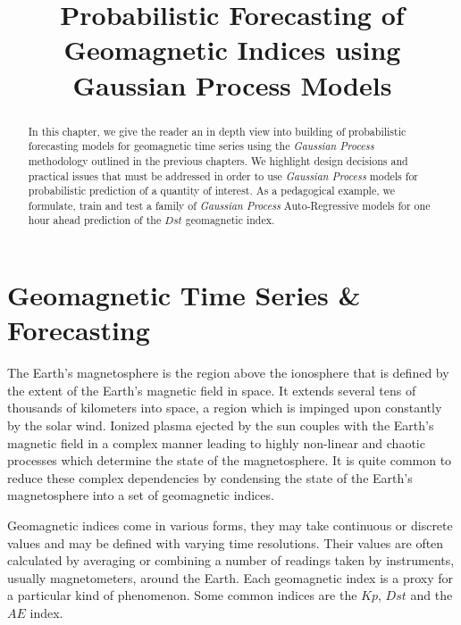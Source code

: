 \documentclass{article}
\title{Probabilistic Forecasting of Geomagnetic Indices using Gaussian Process Models}
\begin{document}
\maketitle

\begin{abstract}

  In this chapter, we give the reader an in depth view into building of
  probabilistic forecasting models for geomagnetic time series using the
  \emph{Gaussian Process} methodology outlined in the previous
  chapters. We highlight design decisions and practical issues that must
  be addressed in order to use \emph{Gaussian Process} models for
  probabilistic prediction of a quantity of interest. As a pedagogical
  example, we formulate, train and test a family of \emph{Gaussian
    Process} Auto-Regressive models for one hour ahead prediction of the $Dst$ geomagnetic index.  

\end{abstract}

\section{Geomagnetic Time Series \& Forecasting}

The Earth's magnetosphere is the region above the ionosphere that is defined by the extent of the Earth's magnetic field in space. It extends several tens of thousands of kilometers into space, a region which is impinged upon constantly by the solar wind. Ionized plasma ejected by the sun couples with the Earth's magnetic field in a complex manner leading to highly non-linear and chaotic processes which determine the state of the magnetosphere. It is quite common to reduce these complex dependencies by condensing the state of the Earth's magnetosphere into a set of geomagnetic indices.

Geomagnetic indices come in various forms, they may take continuous or discrete values and may be defined with varying time resolutions. Their values are often calculated by averaging or combining a number of readings taken by instruments, usually magnetometers, around the Earth. Each geomagnetic index is a proxy for a particular kind of phenomenon. Some common indices are the $Kp$, $Dst$ and the $AE$ index.
\end{document}
